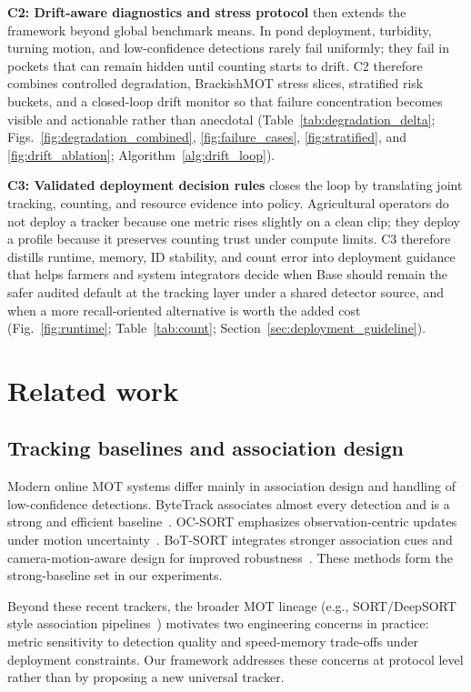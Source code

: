 \documentclass[5p,twocolumn,a4paper]{elsarticle}
\begin{document}
\textbf{C2: Drift-aware diagnostics and stress protocol} then extends the framework beyond global benchmark means. In pond deployment, turbidity, turning motion, and low-confidence detections rarely fail uniformly; they fail in pockets that can remain hidden until counting starts to drift. C2 therefore combines controlled degradation, BrackishMOT stress slices, stratified risk buckets, and a closed-loop drift monitor so that failure concentration becomes visible and actionable rather than anecdotal (Table~\ref{tab:degradation_delta}; Figs.~\ref{fig:degradation_combined}, \ref{fig:failure_cases}, \ref{fig:stratified}, and \ref{fig:drift_ablation}; Algorithm~\ref{alg:drift_loop}).

\textbf{C3: Validated deployment decision rules} closes the loop by translating joint tracking, counting, and resource evidence into policy. Agricultural operators do not deploy a tracker because one metric rises slightly on a clean clip; they deploy a profile because it preserves counting trust under compute limits. C3 therefore distills runtime, memory, ID stability, and count error into deployment guidance that helps farmers and system integrators decide when Base should remain the safer audited default at the tracking layer under a shared detector source, and when a more recall-oriented alternative is worth the added cost (Fig.~\ref{fig:runtime}; Table~\ref{tab:count}; Section~\ref{sec:deployment_guideline}).

\section{Related work}
\subsection{Tracking baselines and association design}
Modern online MOT systems differ mainly in association design and handling of low-confidence detections. ByteTrack associates almost every detection and is a strong and efficient baseline~\cite{bytetrack2022}. OC-SORT emphasizes observation-centric updates under motion uncertainty~\cite{ocsort2022}. BoT-SORT integrates stronger association cues and camera-motion-aware design for improved robustness~\cite{botsort2022}. These methods form the strong-baseline set in our experiments.

Beyond these recent trackers, the broader MOT lineage (e.g., SORT/DeepSORT style association pipelines~\cite{sort2016,deepsort2017}) motivates two engineering concerns in practice: metric sensitivity to detection quality and speed-memory trade-offs under deployment constraints. Our framework addresses these concerns at protocol level rather than by proposing a new universal tracker.
\end{document}
